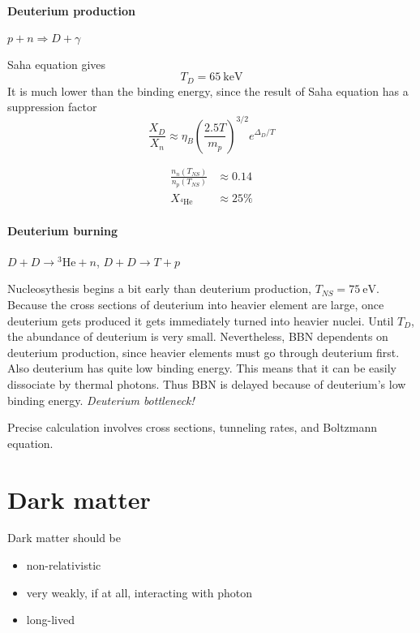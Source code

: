 \documentclass[12pt, a4paper, DIV=15]{article}
\numberwithin{equation}{section}
\begin{document}
\paragraph{Deuterium production}
$p+n \Rightarrow D+\gamma$

Saha equation gives
\begin{equation}
   T_D = \SI{65}{\kilo\eV}
\end{equation}
It is much lower than the binding energy, since the result of Saha equation has a suppression factor
\begin{equation}
   \frac{X_D}{X_n} \approx \eta_B \left( \frac{2.5 T}{m_p} \right)^{3/2} e^{\Delta_D / T}
\end{equation}

\begin{align}
   \frac{n_n(T_{NS})}{n_p(T_{NS})} &\approx 0.14 \\
   X_{{}^4 \text{He}} &\approx 25 \%
\end{align}
\paragraph{Deuterium burning}
$D+ D \rightarrow {}^3 \text{He} + n$, $D + D \rightarrow T+ p$

Nucleosythesis begins a bit early than deuterium production, $T_{NS} = \SI{75}{\eV}$. Because the cross sections of deuterium into heavier element are large, once deuterium gets produced it gets immediately turned into heavier nuclei. Until $T_D$, the abundance of deuterium is very small. Nevertheless, BBN dependents on deuterium production, since heavier elements must go through deuterium first. Also deuterium has quite low binding energy. This means that it can be easily dissociate by thermal photons. Thus BBN is delayed because of deuterium's low binding energy. \textit{Deuterium bottleneck!}

Precise calculation involves cross sections, tunneling rates, and Boltzmann equation.

\section{Dark matter}
Dark matter should be
\begin{itemize}
   \item non-relativistic
   \item very weakly, if at all, interacting with photon
   \item long-lived
\end{itemize}
\end{document}
